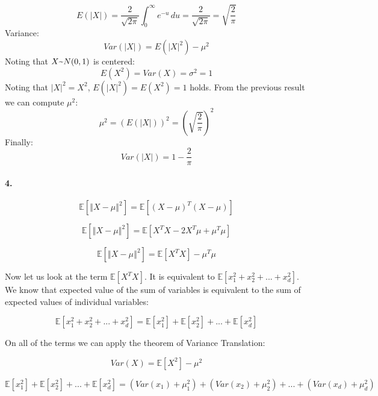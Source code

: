 \documentclass[10pt,letterpaper]{article}
\newcommand{\mytexttilde}{\raisebox{0.5ex}{\texttildelow}}
\begin{document}
\[
E(|X|) = \frac{2}{\sqrt{2 \pi}} \int_{0}^{\infty} e^{-u} \, du = \frac{2}{\sqrt{2 \pi}} = \sqrt{\frac{2}{\pi}} 
\]  
Variance:
\[
Var(|X|) = E(|X|^2) - \mu^2
\]
Noting that $X\mytexttilde N(0,1)$ is centered: 
\[
E(X^2)=Var(X)=\sigma^2=1
\]
Noting that \(|X|^2=X^2\), \(E(|X|^2)=E(X^2)=1\) holds.
From the previous result we can compute \(\mu^2\):
\[
\mu^2 = (E(|X|))^2 =(\sqrt{\frac{2}{\pi}})^2
\]
Finally:
\[
Var(|X|)=1-\frac{2}{\pi}
\]

\paragraph{4.}

    \begin{equation}
        \mathbb{E}[\left \Vert X-\mu \right \Vert ^2] = 
        \mathbb{E}[(X-\mu)^T(X-\mu)]
    \end{equation}
    
    \begin{equation}
       \mathbb{E}[\left \Vert X-\mu \right \Vert ^2] = 
       \mathbb{E}[X^TX - 2X^T\mu + \mu^T\mu]
    \end{equation}

    \begin{equation}
       \mathbb{E}[\left \Vert X-\mu \right \Vert ^2] = 
       \mathbb{E}[X^TX] - \mu^T\mu
    \end{equation}

Now let us look at the term $\mathbb{E}[X^TX]$. It is equivalent to $\mathbb{E}[x_1^2 + x_2^2 + ... + x_d^2]$. We know that expected value of the sum of variables is equivalent to the sum of expected values of individual variables: 

    \begin{equation}
       \mathbb{E}[x_1^2 + x_2^2 + ... + x_d^2] = 
       \mathbb{E}[x_1^2] + \mathbb{E}[x_2^2] + ... + \mathbb{E}[x_d^2]
    \end{equation}

On all of the terms we can apply the theorem of Variance Translation: 

    \begin{equation}
       Var(X) =  \mathbb{E}[X^2] - \mu^2
    \end{equation}

    \begin{equation}
       \mathbb{E}[x_1^2] + \mathbb{E}[x_2^2] + ... + \mathbb{E}[x_d^2] = (Var(x_1) + \mu_1^2) + (Var(x_2) + \mu_2^2) + ... + (Var(x_d) + \mu_d^2)
    \end{equation}
\end{document}

